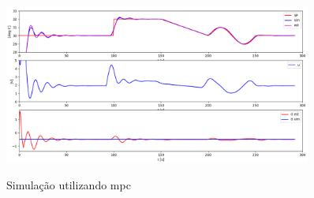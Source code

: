 \begin{figure}[h]
    \caption{Simulação utilizando \acrlong{mpc}}
	\begin{center}
        \includegraphics[width=0.9\textwidth]{./5_images/fig_mpc_example.png} 
		\label{fig:mpc_example}
	\end{center}
    \centering
\end{figure}

